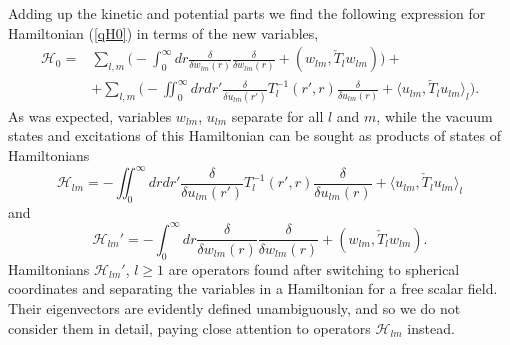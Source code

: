\documentclass[12pt]{article}
\newcommand{\HH}{\mathscr{H}}
\begin{document}
	Adding up the kinetic and potential parts we find the following
	expression for Hamiltonian
(\ref{qH0})
	in terms of the new variables,
\begin{align*}
    \HH_{0} =& \sum_{l,m} \bigl( -\int_{0}^{\infty} dr
	\frac{\delta}{\delta w_{lm}(r)} \frac{\delta}{\delta w_{lm}(r)}
	    + (w_{lm},\check{T}_{l} w_{lm})\bigr)+\\
    &+ \sum_{l,m} \bigl(-\iint_{0}^{\infty} dr dr'
    \frac{\delta}{\delta u_{lm}(r')} T_{l}^{-1}(r',r)
	\frac{\delta}{\delta u_{lm}(r)}
	    + \langle u_{lm}, \check{T}_{l} u_{lm}\rangle_{l} \bigr).
\end{align*}
	As was expected, variables
$ w_{lm} $, 
$ u_{lm} $
	separate for all
$ l $ and $ m $,
	while the vacuum states and excitations of this Hamiltonian
	can be sought as products of states of Hamiltonians
\begin{equation}
\label{Hlm}
    \HH_{lm} = -\iint_{0}^{\infty} dr dr'
    \frac{\delta}{\delta u_{lm}(r')} T_{l}^{-1}(r',r)
	\frac{\delta}{\delta u_{lm}(r)}
	+ \langle u_{lm}, \check{T}_{l}u_{lm}\rangle_{l}
\end{equation}
	and
\begin{equation*}
    \HH_{lm}' = -\int_{0}^{\infty} dr
	\frac{\delta}{\delta w_{lm}(r)} \frac{\delta}{\delta w_{lm}(r)}
	    + (w_{lm},\check{T}_{l} w_{lm}) .
\end{equation*}
	Hamiltonians
$ \HH_{lm}' $,
$ l \geq 1 $
	are operators found after switching to spherical coordinates
	and separating the variables in a Hamiltonian for
	a free scalar field.
	Their eigenvectors are evidently defined unambiguously,
	and so we do not consider them in detail,
	paying close attention to operators
$ \HH_{lm} $ instead.



\end{document}
